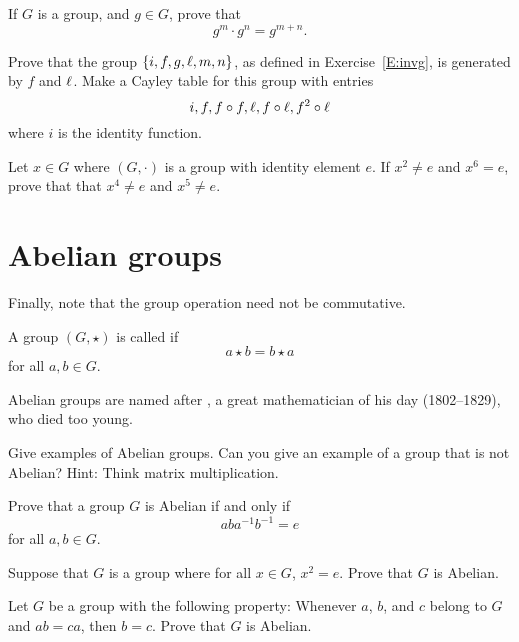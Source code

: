 \documentclass{ximera}
\begin{document}
\begin{exercise}
  If $G$ is a group, and $g\in G$, prove that
  \[
  g^m\cdot g^n = g^{m+n}.
  \]
\end{exercise}

\begin{exercise}
  Prove that the group $\{i,f,g,\ell,m,n\}$, as defined in
  Exercise~\ref{E:invg}, is generated by $f$ and $\ell$. Make a Cayley
  table for this group with entries
  \[
  i, f, f\circ f, \ell, f\circ \ell,f^2\circ \ell
  \]
  where $i$ is the identity function.
\end{exercise}

\begin{exercise}
  Let $x \in G$ where $(G,\cdot)$ is a group with identity element
  $e$. If $x^2 \ne e$ and $x^6 = e$, prove that that $x^4 \ne e$ and
  $x^5 \ne e$.
\end{exercise}


\section{Abelian groups}


Finally, note that the group operation need not be commutative.

\begin{definition}
  A group $(G,\star)$ is called  if
  \[
  a\star b = b\star a
  \]
  for all $a,b\in G$.
\end{definition}

Abelian groups are named after ,
a great mathematician of his day (1802--1829), who died too young. 

\begin{exercise}
  Give examples of Abelian groups. Can you give an example of a group
  that is not Abelian? Hint: Think matrix multiplication.
\end{exercise}

\begin{exercise}
  Prove that a group $G$ is Abelian if and only if
  \[
  aba^{-1}b^{-1} = e
  \]
  for all $a,b\in G$.
\end{exercise}


\begin{exercise}
  Suppose that $G$ is a group where for all $x\in G$, $x^2 =e$. Prove
  that $G$ is Abelian.
\end{exercise}

\begin{exercise}
  Let $G$ be a group with the following property: Whenever $a$, $b$,
  and $c$ belong to $G$ and $ab = ca$, then $b = c$. Prove that $G$ is
  Abelian.
\end{exercise}
\end{document}
